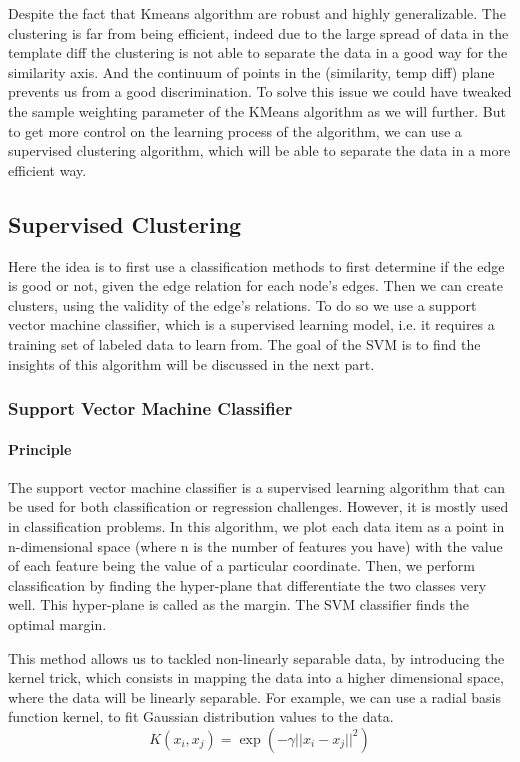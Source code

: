 \documentclass[11pt,a4paper]{report}
\begin{document}
\begin{multicols}{2}
    Despite the fact that Kmeans algorithm are robust and highly generalizable. The clustering is far from being efficient, indeed due to the large spread of data in the template diff the clustering is not able to separate the data in a good way for the similarity axis.
    And the continuum of points in the (similarity, temp diff) plane prevents us from a good discrimination. To solve this issue we could have tweaked the sample weighting parameter of the KMeans algorithm as we will further. But to get more control on the learning process of the algorithm, we can use a supervised clustering algorithm, which will be able to separate the data in a more efficient way.
    \subsection{Supervised Clustering}
    Here the idea is to first use a classification methods to first determine if the edge is good or not, given the edge relation for each node's edges. Then we can create clusters, using the validity
    of the edge's relations. To do so we use a support vector machine classifier, which is a supervised learning model, i.e. it requires a training set of labeled data to learn from. The goal of the SVM is to find the insights of this algorithm will be discussed in the next part.
    \subsubsection{Support Vector Machine Classifier}
    \paragraph{Principle}
    The support vector machine \cite{kernel} classifier is a supervised learning algorithm that can be used for both classification or regression challenges. However, it is mostly used in classification problems.
    In this algorithm, we plot each data item as a point in n-dimensional space (where n is the number of features you have) with the value of each feature being the value of a particular coordinate.
    Then, we perform classification by finding the hyper-plane that differentiate the two classes very well. This hyper-plane is called as the margin. The SVM classifier finds the optimal margin.


    This method allows us to tackled non-linearly separable data, by introducing the kernel trick, which consists in mapping the data into a higher dimensional space, where the data will be linearly separable. For example,
    we can use a radial basis function kernel, to fit Gaussian distribution values to the data.
    $$K(x_i, x_j) = \exp(-\gamma ||x_i - x_j||^2)$$

\end{multicols}
\end{document}
